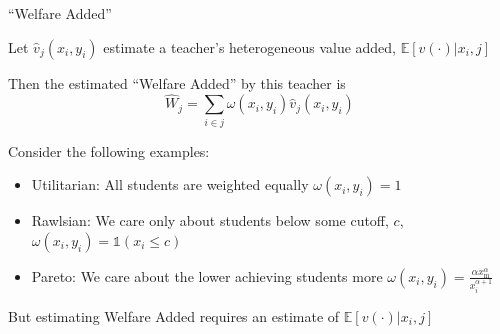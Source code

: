 \documentclass[t,aspectratio=169,11pt]{beamer}
\newenvironment{wideitemize}{\itemize\addtolength{\itemsep}{14pt}}{\enditemize}
\begin{document}
\begin{frame}{``Welfare Added''}

\begin{wideitemize}
    \item Let $\hat{v}_j(x_i,y_i)$ estimate a teacher's heterogeneous value added, $\mathbb{E}[v(\cdot)|x_i,j]$
    
    \item Then the estimated ``Welfare Added'' by this teacher is  
    \[
    \hat{W}_j  = \sum_{i\in j} \omega(x_i,y_i) \hat{v}_j(x_i,y_i) 
    \] 
    
    \item Consider the following examples:
    \begin{itemize}
        \item Utilitarian: All students are weighted equally $\omega(x_i,y_i) = 1$
        \item Rawlsian: We care only about students below some cutoff, $c$, $\omega(x_i,y_i) = \mathds{1}(x_i\leq c)$
        \item Pareto: We care about the lower achieving students more $ \omega(x_i,y_i)=  \frac{\alpha x_\mathrm{m}^\alpha}{x_i^{\alpha+1}}$ 
    \end{itemize}
    
    \item But estimating Welfare Added requires an estimate of $\mathbb{E}[v(\cdot)|x_i,j]$
\end{wideitemize}


\end{frame}

\end{document}
